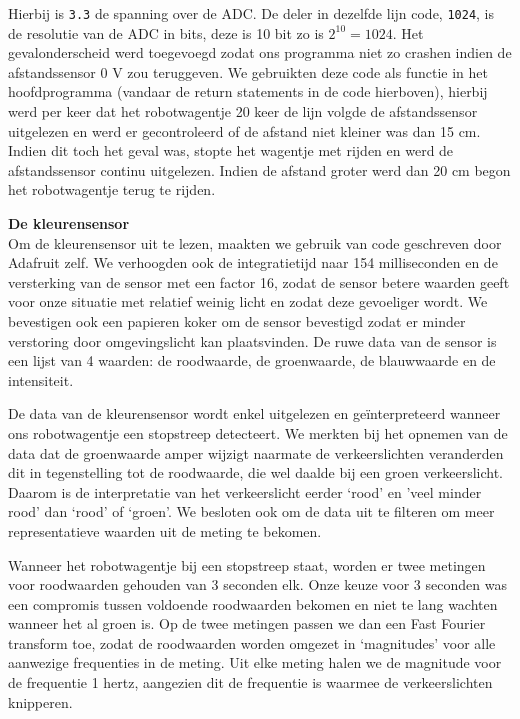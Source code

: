 \documentclass[a4paper,kulak]{kulakarticle}
\begin{document}
Hierbij is \texttt{3.3} de spanning over de ADC. De deler in dezelfde lijn code, \texttt{1024}, is de resolutie van de ADC in bits, deze is 10 bit zo is \(2^10 = 1024\). Het gevalonderscheid werd toegevoegd zodat ons programma niet zo crashen indien de afstandssensor 0 V zou teruggeven. We gebruikten deze code als functie in het hoofdprogramma (vandaar de return statements in de code hierboven), hierbij werd per keer dat het robotwagentje 20 keer de lijn volgde de afstandssensor uitgelezen en werd er gecontroleerd of de afstand niet kleiner was dan 15 cm. Indien dit toch het geval was, stopte het wagentje met rijden en werd de afstandssensor continu uitgelezen. Indien de afstand groter werd dan 20 cm begon het robotwagentje terug te rijden. 

\textbf{\large De kleurensensor}\\
Om de kleurensensor uit te lezen, maakten we gebruik van code geschreven door Adafruit zelf. We verhoogden ook de integratietijd naar 154 milliseconden en de versterking van de sensor met een factor 16, zodat de sensor betere waarden geeft voor onze situatie met relatief weinig licht en zodat deze gevoeliger wordt. We bevestigen ook een papieren koker  om de sensor bevestigd zodat er minder verstoring door omgevingslicht kan plaatsvinden. De ruwe data van de sensor is een lijst van 4 waarden: de roodwaarde, de groenwaarde, de blauwwaarde en de intensiteit. 

De data van de kleurensensor wordt enkel uitgelezen en geïnterpreteerd wanneer ons robotwagentje een stopstreep detecteert. We merkten bij het opnemen van de data dat de groenwaarde amper wijzigt naarmate de verkeerslichten veranderden dit in tegenstelling tot de roodwaarde, die wel daalde bij een groen verkeerslicht. Daarom is de interpretatie van het verkeerslicht eerder `rood' en 'veel minder rood' dan `rood' of `groen'. We besloten ook om de data uit te filteren om meer representatieve waarden uit de meting te bekomen.

Wanneer het robotwagentje bij een stopstreep staat, worden er twee metingen voor roodwaarden gehouden van 3 seconden elk. Onze keuze voor 3 seconden was een compromis tussen voldoende roodwaarden bekomen en niet te lang wachten wanneer het al groen is. Op de twee metingen passen we dan een Fast Fourier transform toe, zodat de roodwaarden worden omgezet in `magnitudes' voor alle aanwezige frequenties in de meting. Uit elke meting halen we de magnitude voor de frequentie 1 hertz, aangezien dit de frequentie is waarmee de verkeerslichten knipperen.
\end{document}
